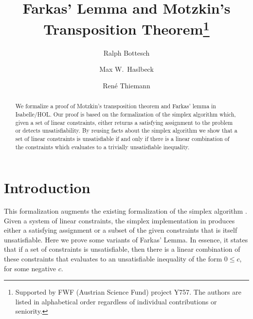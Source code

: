 \documentclass[11pt,a4paper]{article}
\begin{document}
\title{Farkas' Lemma and Motzkin's Transposition Theorem\footnote{
Supported by FWF (Austrian Science Fund) project Y757.
The authors are listed in alphabetical order regardless of individual
contributions or seniority.}
}
\author{Ralph Bottesch \and Max W.\ Haslbeck \and Ren\'e Thiemann}

\maketitle

\begin{abstract}
We formalize a proof of Motzkin's transposition theorem and Farkas' lemma
in Isabelle/HOL.
Our proof is based on the formalization of the simplex algorithm which, given a
set of linear constraints, either returns a satisfying assignment to the problem or
detects unsatisfiability.
By reusing facts about the simplex algorithm we show that a set of
linear constraints is unsatisfiable if and only if there is a linear combination
of the constraints which evaluates to a trivially unsatisfiable inequality.

% 
\end{abstract}


\tableofcontents

\section{Introduction}
This formalization augments the existing formalization of the simplex algorithm 
\cite{simplex-afp,SpasicMaric,Thiemann18}. Given
a system of linear constraints, the simplex implementation in \cite{simplex-afp} produces 
either a satisfying assignment or a subset
of the given constraints that is itself unsatisfiable. Here we prove some variants of Farkas' Lemma.
In essence, it states that if a set of constraints is unsatisfiable, then there is a linear combination of these
constraints that evaluates to an unsatisfiable inequality of the form $0 \leq c$, for some negative $c$.
\end{document}

